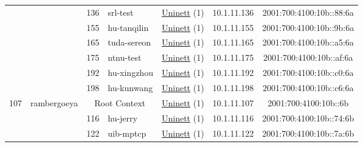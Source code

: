\begin{small}
\begin{center}
\begin{longtable}{|c|c|c|c|c|c|c|c|}
  &  & \tiny{136} & \multicolumn{1}{|l|}{\tiny{srl-test}} & \multicolumn{2}{|c|}{\tiny{\href{https://www.uninett.no}{Uninett} (1)}} & \tiny{10.1.11.136} & \tiny{2001:700:4100:10b::88:6a} \\* \cline{3-3}\cline{4-4}\cline{5-5}\cline{6-6}\cline{7-7}\cline{8-8}
  &  & \tiny{155} & \multicolumn{1}{|l|}{\tiny{hu-tanqilin}} & \multicolumn{2}{|c|}{\tiny{\href{https://www.uninett.no}{Uninett} (1)}} & \tiny{10.1.11.155} & \tiny{2001:700:4100:10b::9b:6a} \\* \cline{3-3}\cline{4-4}\cline{5-5}\cline{6-6}\cline{7-7}\cline{8-8}
  &  & \tiny{165} & \multicolumn{1}{|l|}{\tiny{tuda-sereon}} & \multicolumn{2}{|c|}{\tiny{\href{https://www.uninett.no}{Uninett} (1)}} & \tiny{10.1.11.165} & \tiny{2001:700:4100:10b::a5:6a} \\* \cline{3-3}\cline{4-4}\cline{5-5}\cline{6-6}\cline{7-7}\cline{8-8}
  &  & \tiny{175} & \multicolumn{1}{|l|}{\tiny{ntnu-test}} & \multicolumn{2}{|c|}{\tiny{\href{https://www.uninett.no}{Uninett} (1)}} & \tiny{10.1.11.175} & \tiny{2001:700:4100:10b::af:6a} \\* \cline{3-3}\cline{4-4}\cline{5-5}\cline{6-6}\cline{7-7}\cline{8-8}
  &  & \tiny{192} & \multicolumn{1}{|l|}{\tiny{hu-xingzhou}} & \multicolumn{2}{|c|}{\tiny{\href{https://www.uninett.no}{Uninett} (1)}} & \tiny{10.1.11.192} & \tiny{2001:700:4100:10b::c0:6a} \\* \cline{3-3}\cline{4-4}\cline{5-5}\cline{6-6}\cline{7-7}\cline{8-8}
  &  & \tiny{198} & \multicolumn{1}{|l|}{\tiny{hu-kunwang}} & \multicolumn{2}{|c|}{\tiny{\href{https://www.uninett.no}{Uninett} (1)}} & \tiny{10.1.11.198} & \tiny{2001:700:4100:10b::c6:6a} \\ \hline
 \multirow{13}{*}{\tiny{107}} & \multicolumn{1}{|l|}{\multirow{13}{*}{\tiny{rambergoeya}}} & \multicolumn{2}{|c|}{\tiny{Root Context}} & \multicolumn{2}{|c|}{\tiny{\href{https://www.uninett.no}{Uninett} (1)}} & \tiny{10.1.11.107} & \tiny{2001:700:4100:10b::6b} \\* \cline{3-3}\cline{4-4}\cline{5-5}\cline{6-6}\cline{7-7}\cline{8-8}
  &  & \tiny{116} & \multicolumn{1}{|l|}{\tiny{hu-jerry}} & \multicolumn{2}{|c|}{\tiny{\href{https://www.uninett.no}{Uninett} (1)}} & \tiny{10.1.11.116} & \tiny{2001:700:4100:10b::74:6b} \\* \cline{3-3}\cline{4-4}\cline{5-5}\cline{6-6}\cline{7-7}\cline{8-8}
  &  & \tiny{122} & \multicolumn{1}{|l|}{\tiny{uib-mptcp}} & \multicolumn{2}{|c|}{\tiny{\href{https://www.uninett.no}{Uninett} (1)}} & \tiny{10.1.11.122} & \tiny{2001:700:4100:10b::7a:6b} \\* \cline{3-3}\cline{4-4}\cline{5-5}\cline{6-6}\cline{7-7}\cline{8-8}

\end{longtable}
\end{center}
\end{small}
